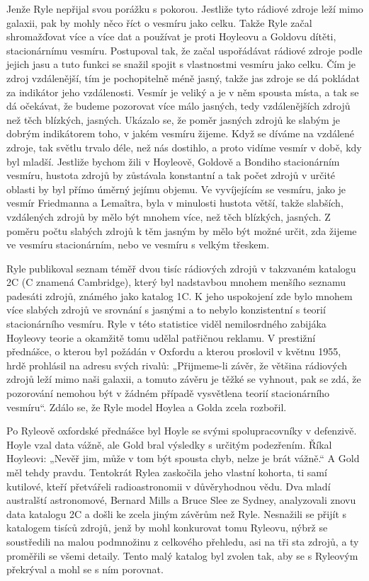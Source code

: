   Jenže Ryle nepřijal svou porážku s pokorou. Jestliže tyto rádiové zdroje leží mimo galaxii, pak by
  mohly něco říct o vesmíru jako celku. Takže Ryle začal shromažďovat více a více dat a používat je
  proti Hoyleovu a Goldovu dítěti, stacionárnímu vesmíru. Postupoval tak, že začal uspořádávat
  rádiové zdroje podle jejich jasu a tuto funkci se snažil spojit s vlastnostmi vesmíru jako celku.
  Čím je zdroj vzdálenější, tím je pochopitelně méně jasný, takže jas zdroje se dá pokládat za
  indikátor jeho vzdálenosti. Vesmír je veliký a je v něm spousta místa, a tak se dá očekávat, že
  budeme pozorovat více málo jasných, tedy vzdálenějších zdrojů než těch blízkých, jasných. Ukázalo
  se, že poměr jasných zdrojů ke slabým je dobrým indikátorem toho, v jakém vesmíru žijeme. Když se
  díváme na vzdálené zdroje, tak světlu trvalo déle, než nás dostihlo, a proto vidíme vesmír v době,
  kdy byl mladší. Jestliže bychom žili v Hoyleově, Goldově a Bondiho stacionárním vesmíru, hustota
  zdrojů by zůstávala konstantní a tak počet zdrojů v určité oblasti by byl přímo úměrný jejímu
  objemu. Ve vyvíjejícím se vesmíru, jako je vesmír Friedmanna a Lemaîtra, byla v minulosti hustota
  větší, takže slabších, vzdálených zdrojů by mělo být mnohem více, než těch blízkých, jasných. Z
  poměru počtu slabých zdrojů k těm jasným by mělo být možné určit, zda žijeme ve vesmíru
  stacionárním, nebo ve vesmíru s velkým třeskem. 

  Ryle publikoval seznam téměř dvou tisíc rádiových zdrojů v takzvaném katalogu 2C (C znamená
  Cambridge), který byl nadstavbou mnohem menšího seznamu padesáti zdrojů, známého jako katalog 1C.
  K jeho uspokojení zde bylo mnohem více slabých zdrojů ve srovnání s jasnými a to nebylo
  konzistentní s teorií stacionárního vesmíru. Ryle v této statistice viděl nemilosrdného zabijáka
  Hoyleovy teorie a okamžitě tomu udělal patřičnou reklamu. V prestižní přednášce, o kterou byl
  požádán v Oxfordu a kterou proslovil v květnu 1955, hrdě prohlásil na adresu svých rivalů:
  „Přijmeme-li závěr, že většina rádiových zdrojů leží mimo naši galaxii, a tomuto závěru je těžké
  se vyhnout, pak se zdá, že pozorování nemohou být v žádném případě vysvětlena teorií stacionárního
  vesmíru“. Zdálo se, že Ryle model Hoylea a Golda zcela rozbořil. 

  Po Ryleově oxfordské přednášce byl Hoyle se svými spolupracovníky v defenzivě. Hoyle vzal data
  vážně, ale Gold bral výsledky s určitým podezřením. Říkal Hoyleovi: „Nevěř jim, může v tom být
  spousta chyb, nelze je brát vážně.“ A Gold měl tehdy pravdu. Tentokrát Rylea zaskočila jeho
  vlastní kohorta, ti samí kutilové, kteří přetvářeli radioastronomii v důvěryhodnou vědu. Dva mladí
  australští astronomové, Bernard Mills a Bruce Slee ze Sydney, analyzovali znovu data katalogu 2C a
  došli ke zcela jiným závěrům než Ryle. Nesnažili se přijít s katalogem tisíců zdrojů, jenž by mohl
  konkurovat tomu Ryleovu, nýbrž se soustředili na malou podmnožinu z celkového přehledu, asi na tři
  sta zdrojů, a ty proměřili se všemi detaily. Tento malý katalog byl zvolen tak, aby se s Ryleovým
  překrýval a mohl se s ním porovnat. 

